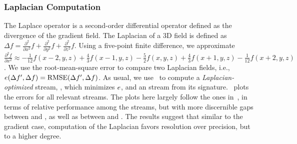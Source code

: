 \subsubsection{Laplacian Computation}\label{sec:laplacian}

The Laplace operator is a second-order differential operator defined as the divergence of the
gradient field. The Laplacian of a 3D field is defined as $\Delta f = 
\frac{{\partial}^2}{\partial{x^2}}f+\frac{{\partial}^2}{\partial{y^2}}f+\frac{{\partial}^2}{\partial{z^2}}f$.
%
Using a five-point finite difference, we approximate 
$\frac{{\partial}^2 f}{\partial{x^2}}
\approx
-\frac{1}{12}f(x-2,y,z)+\frac{4}{3}f(x-1,y,z)-\frac{5}{2}f(x,y,z)+\frac{4}{3}f(x+1,y,z)-\frac{1}{12}f(x+2,y,z)$.
We use the root-mean-square error to compare two Laplacian fields, i.e., $e(\Delta f',\Delta
f)=\text{RMSE}(\Delta f',\Delta f)$. As usual, we use~ to compute a
\emph{Laplacian-optimized} stream, \slop, which minimizes $e$, and an \slsg stream from its
signature.~ plots the errors for all relevant streams. The
plots here largely follow the ones in~, in terms of relative
performance among the streams, but with more discernible gaps between \sbit and \slsg, as well as
between \slsg and \sbit. The results suggest that similar to the gradient case, computation of the
Laplacian favors resolution over precision, but to a higher degree.